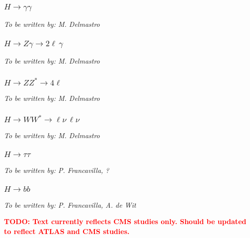 \subsubsection{$H \to \gamma\gamma$}
{\it To be written by: M. Delmastro}

\subsubsection{$H \to Z\gamma \to 2\ell\,\gamma$}
{\it To be written by: M. Delmastro}

\subsubsection{$H \to ZZ^* \to 4\ell$}
{\it To be written by: M. Delmastro}

\subsubsection{$H \to WW^* \to \ell\nu\,\ell\nu$}
{\it To be written by: M. Delmastro}

\subsubsection{$H \to \tau\tau$}
{\it To be written by: P. Francavilla, ?}

\subsubsection{$H \to bb$}
{\it To be written by: P. Francavilla, A. de Wit}

\newcommand{\TeV}{\ensuremath{\,\text{Te\hspace{-.08em}V}}\xspace}
\providecommand{\fbinv}{\mbox{\ensuremath{\,\text{fb}^\text{$-$1}}}\xspace}
\newcommand{\vh}{\ensuremath{\mathrm{V}\PH}\xspace}
\newcommand{\ttbar}{\ensuremath{\Pqt\Paqt}\xspace}
\newcommand{\zh}{\ensuremath{\PZ\PH}\xspace}
\newcommand{\ggZH}{\ensuremath{\Pg\Pg\PZ\PH}\xspace}
\providecommand{\wip}[1]{\textcolor{red}{\bfseries TODO: #1}\xspace}


\wip{Text currently reflects CMS studies only. Should be updated to reflect ATLAS and CMS studies.}

